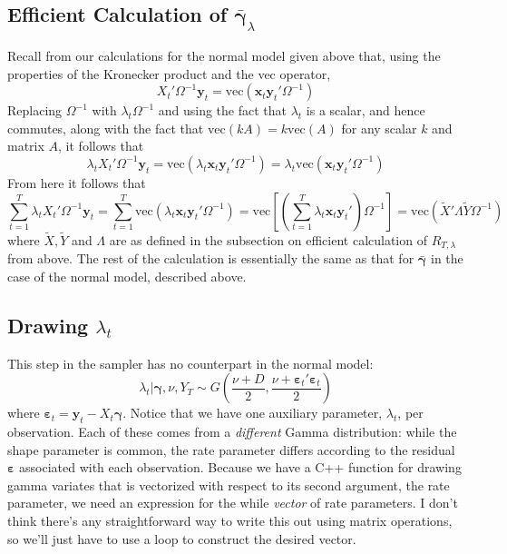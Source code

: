 \documentclass[12pt]{article}
\begin{document}
\subsection{Efficient Calculation of $\bar{\boldsymbol{\gamma}}_{\lambda}$}
Recall from our calculations for the normal model given above that, using the properties of the Kronecker product and the vec operator,
\begin{equation*}
  X_t' \Omega^{-1} \mathbf{y}_t = \mbox{vec}(\mathbf{x}_t \mathbf{y}_t' \Omega^{-1})
\end{equation*}
Replacing $\Omega^{-1}$ with $\lambda_t \Omega^{-1}$ and using the fact that $\lambda_t$ is a scalar, and hence commutes, along with the fact that  $\mbox{vec}(kA)=k \mbox{vec}(A)$ for any scalar $k$ and matrix $A$, it follows that
\begin{equation*}
  \lambda_t X_t' \Omega^{-1} \mathbf{y}_t = \mbox{vec}( \lambda_t\mathbf{x}_t \mathbf{y}_t' \Omega^{-1}) = \lambda_t\mbox{vec}(\mathbf{x}_t \mathbf{y}_t' \Omega^{-1})
\end{equation*}
From here it follows that
\begin{equation*}
  \sum_{t=1}^T  \lambda_t X_t' \Omega^{-1} \mathbf{y}_t = \sum_{t=1}^T\mbox{vec}(\lambda_t \mathbf{x}_t \mathbf{y}_t' \Omega^{-1}) =\mbox{vec}\left[ \left(\sum_{t=1}^T \lambda_t\mathbf{x}_t \mathbf{y}_t' \right)\Omega^{-1}\right] = \mbox{vec}\left( \widetilde{X}
  ' \Lambda \widetilde{Y} \Omega^{-1}\right)
\end{equation*}
where $\widetilde{X}, \widetilde{Y}$ and $\Lambda$ are as defined in the subsection on efficient calculation of $R_{T,\lambda}$ from above.
The rest of the calculation is essentially the same as that for $\bar{\boldsymbol{\gamma}}$ in the case of the normal model, described above.


\subsection{Drawing $\lambda_t$}
This step in the sampler has no counterpart in the normal model:
\begin{equation*}
\lambda_t|\boldsymbol{\gamma}, \nu, Y_T \sim G\left(\displaystyle \frac{\nu + D}{2}, \frac{\nu + \boldsymbol{\varepsilon}_t' \boldsymbol{\varepsilon}_t}{2} \right)
\end{equation*}
where $\boldsymbol{\varepsilon}_t = \mathbf{y}_t - X_t \boldsymbol{\gamma}$.
Notice that we have one auxiliary parameter, $\lambda_t$, per observation.
Each of these comes from a \emph{different} Gamma distribution: while the shape parameter is common, the rate parameter differs according to the residual $\boldsymbol{\varepsilon}$ associated with each observation.
Because we have a C++ function for drawing gamma variates that is vectorized with respect to its second argument, the rate parameter, we need an expression for the while \emph{vector} of rate parameters.
I don't think there's any straightforward way to write this out using matrix operations, so we'll just have to use a loop to construct the desired vector.
\end{document}
